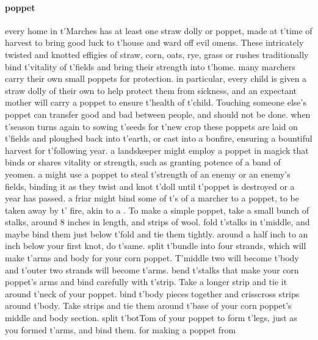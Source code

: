 \paragraph{poppet} every home in t'\allowbreak Marches has at least one straw dolly or poppet, made at t'\allowbreak time of harvest to bring good luck to t'\allowbreak house and ward off evil omens. These intricately twisted and knotted effigies of straw, corn, oats, rye, grass or rushes traditionally bind t'\allowbreak vitality of t'\allowbreak fields and bring their strength into t'\allowbreak home. many marchers carry their own small poppets for protection. in particular, every child is given a straw dolly of their own to help protect them from sickness, and an expectant mother will carry a poppet to ensure t'\allowbreak health of t'\allowbreak child. Touching someone else’s poppet can transfer good and bad between people, and should not be done. when t'\allowbreak season turns again to sowing t'\allowbreak seeds for t'\allowbreak new crop these poppets are laid on t'\allowbreak fields and ploughed back into t'\allowbreak earth, or cast into a bonfire, ensuring a bountiful harvest for t'\allowbreak following year. a landskeeper might employ a poppet in magick that binds or shares vitality or strength, such as granting potence of a band of yeomen. a  might use a poppet to steal t'\allowbreak strength of an enemy or an enemy's fields, binding it as they twist and knot t'\allowbreak doll until t'\allowbreak poppet is destroyed or a year has passed. a friar might bind some of t'\allowbreak {}s of a marcher to a poppet, to be taken away by t'\allowbreak {} fire, akin to a . To make a simple poppet, take a small bunch of stalks, around 8 inches in length, and strips of wool. fold t'\allowbreak stalks in t'\allowbreak middle, and maybe bind them just below t'\allowbreak fold and tie them tightly. around a half inch to an inch below your first knot, do t'\allowbreak same. split t'\allowbreak bundle into four strands, which will make t'\allowbreak arms and body for your corn poppet. T'middle two will become t'\allowbreak body and t'\allowbreak outer two strands will become t'\allowbreak arms. bend t'\allowbreak stalks that make your corn poppet’s arms and bind carefully with t'\allowbreak strip. Take a longer strip and tie it around t'\allowbreak neck of your poppet. bind t'\allowbreak body pieces together and crisscross strips around t'\allowbreak body. Take strips and tie them around t'\allowbreak base of your corn poppet’s middle and body section. split t'\allowbreak botTom of your poppet to form t'\allowbreak legs, just as you formed t'\allowbreak arms, and bind them. for making a poppet from 
